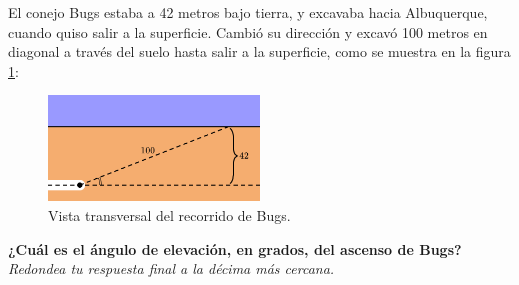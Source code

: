 \question[25] El conejo Bugs estaba a 42 metros bajo tierra, y excavaba hacia Albuquerque, cuando quiso salir
a la superficie. Cambió su dirección y excavó 100 metros en diagonal a través del suelo hasta salir
a la superficie, como se muestra en la figura \ref{fig:bugs}:

\begin{figure}[H]
    \begin{center}
        \includegraphics[width=0.5\textwidth]{../images/bugs.png}
    \end{center}
    \caption{Vista transversal del recorrido de Bugs.}
    \label{fig:bugs}
\end{figure}
\textbf{¿Cuál es el ángulo de elevación, en grados, del ascenso de Bugs?}\\
\textit{Redondea tu respuesta final a la décima más cercana.}